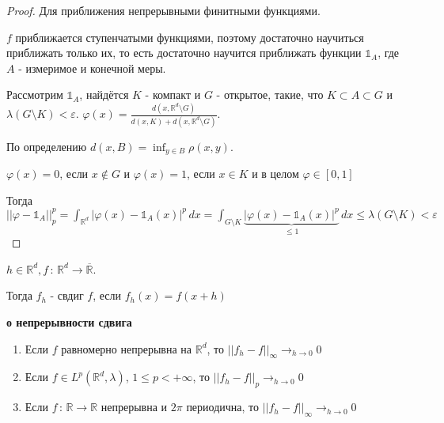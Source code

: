 \begin{proof}
    Для приближения непрерывными финитными функциями.

    $f$ приближается ступенчатыми функциями, поэтому достаточно научиться приближать только их, то есть
    достаточно научится приближать функции $\mathds{1}_A$, где $A$ - измеримое и конечной меры.

    Рассмотрим $\mathds{1}_A$, найдётся $K$ - компакт и $G$ - открытое, такие, что $K \subset A \subset G$ и 
    $\lambda (G \setminus K) < \varepsilon$. $\varphi (x) = \frac{d(x, \mathbb{R}^d \setminus G)}{d(x, K) + d(x, \mathbb{R}^d \setminus G)}$.

    По определению $d(x, B) = \inf_{y \in B} \rho (x, y)$.

    $\varphi(x) = 0$, если $x \not \in G$ и $\varphi(x) = 1$, если $x \in K$ и в целом $\varphi \in [0, 1]$

    Тогда $||\varphi - \mathds{1}_A||_p^p = \int_{\mathbb{R}^d} |\varphi (x) - \mathds{1}_A (x)|^p \, dx =
    \int_{G \setminus K} \underbrace{|\varphi (x) - \mathds{1}_A(x) |^p}_{\leqslant 1} \, dx \leqslant \lambda (G \setminus K) < \varepsilon$
\end{proof}

\begin{definition}
    $h \in \mathbb{R}^d, f \, : \, \mathbb{R}^d \to \overline{\mathbb{R}}$.

    Тогда $f_h$ - свдиг $f$, если $f_h(x) = f(x + h)$
\end{definition}

\begin{theorem}
    \textbf{о непрерывности сдвига}

    \begin{enumerate}
        \item {
            Если $f$ равномерно непрерывна на $\mathbb{R}^d$, то $||f_h - f||_{\infty} \rightarrow_{h \to 0} 0$
        }
        \item {
            Если $f \in L^p (\mathbb{R}^d, \lambda)$, $1 \leqslant p < +\infty$, то $||f_h - f||_p \rightarrow_{h \to 0} 0$
        }
        \item {
            Если $f \, : \, \mathbb{R} \to \mathbb{R}$ непрерывна и $2\pi$ периодична, то $||f_h - f||_{\infty} \rightarrow_{h \to 0} 0$
        }
    \end{enumerate}
\end{theorem}

